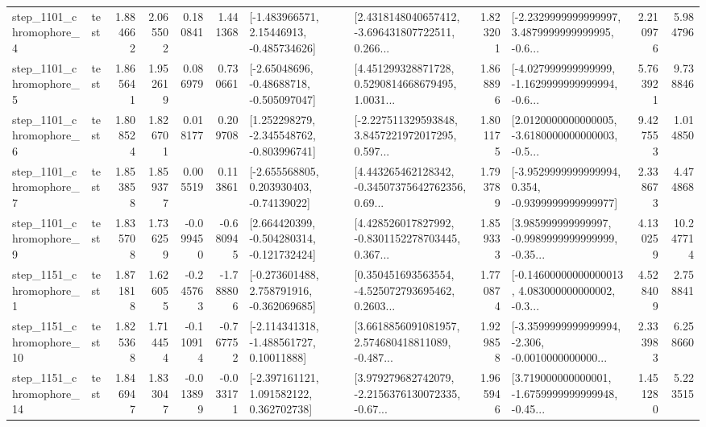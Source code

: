 \begin{tabular}{llrrrrllrlrr}
  step\_1101\_chromophore\_4 &      test &      1.884662 &    2.065502 &      0.180841 &  1.441368 &    [-1.483966571, 2.15446913, -0.485734626] &  [2.4318148040657412, -3.696431807722511, 0.266... &       1.823201 &  [-2.2329999999999997, 3.4879999999999995, -0.6... &            2.210976 &          5.984796 \\
  step\_1101\_chromophore\_5 &      test &      1.865641 &    1.952619 &      0.086979 &  0.730661 &    [-2.65048696, -0.48688718, -0.505097047] &  [4.451299328871728, 0.5290814668679495, 1.0031... &       1.868896 &  [-4.027999999999999, -1.1629999999999994, -0.6... &            5.763921 &          9.738846 \\
  step\_1101\_chromophore\_6 &      test &      1.808524 &    1.826701 &      0.018177 &  0.209708 &   [1.252298279, -2.345548762, -0.803996741] &  [-2.227511329593848, 3.8457221972017295, 0.597... &       1.801175 &  [2.0120000000000005, -3.6180000000000003, -0.5... &            9.427553 &          1.014850 \\
  step\_1101\_chromophore\_7 &      test &      1.853858 &    1.859377 &      0.005519 &  0.113861 &    [-2.655568805, 0.203930403, -0.74139022] &  [4.443265462128342, -0.34507375642762356, 0.69... &       1.793789 &  [-3.9529999999999994, 0.354, -0.9399999999999977] &            2.338673 &          4.474868 \\
  step\_1101\_chromophore\_9 &      test &      1.835708 &    1.736259 &     -0.099450 & -0.680945 &   [2.664420399, -0.504280314, -0.121732424] &  [4.428526017827992, -0.8301152278703445, 0.367... &       1.859333 &  [3.985999999999997, -0.9989999999999999, -0.35... &            4.130259 &         10.247714 \\
  step\_1151\_chromophore\_1 &      test &      1.871818 &    1.626055 &     -0.245763 & -1.788806 &   [-0.273601488, 2.758791916, -0.362069685] &  [0.350451693563554, -4.525072793695462, 0.2603... &       1.770874 &  [-0.14600000000000013, 4.083000000000002, -0.3... &            4.528409 &          2.758841 \\
 step\_1151\_chromophore\_10 &      test &      1.825368 &    1.714454 &     -0.110914 & -0.767752 &    [-2.114341318, -1.488561727, 0.10011888] &  [3.6618856091081957, 2.574680418811089, -0.487... &       1.929858 &  [-3.3599999999999994, -2.306, -0.0010000000000... &            2.333983 &          6.258660 \\
 step\_1151\_chromophore\_14 &      test &      1.846947 &    1.833047 &     -0.013899 & -0.033171 &    [-2.397161121, 1.091582122, 0.362702738] &  [3.979279682742079, -2.2156376130072335, -0.67... &       1.965946 &  [3.719000000000001, -1.6759999999999948, -0.45... &            1.451280 &          5.223515 \\

\end{tabular}
